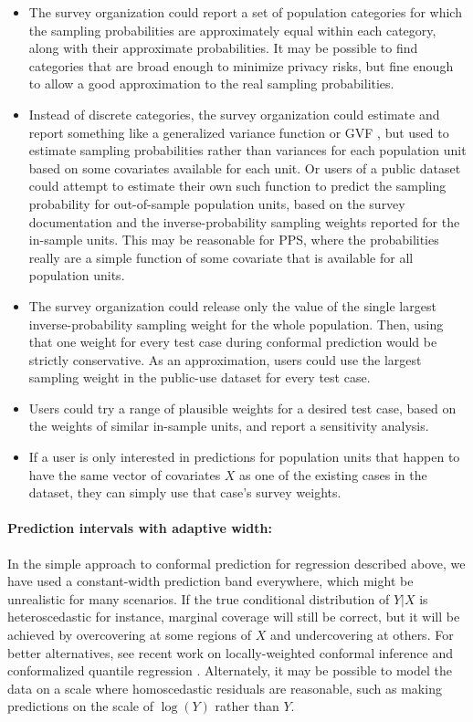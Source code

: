 \documentclass[10.5pt, letterpaper]{article}
\numberwithin{table}{section}
\numberwithin{figure}{section}
\numberwithin{equation}{section}
\begin{document}
\begin{itemize}
  \item The survey organization could report a set of population categories for which the sampling probabilities are approximately equal within each category, along with their approximate probabilities. It may be possible to find categories that are broad enough to minimize privacy risks, but fine enough to allow a good approximation to the real sampling probabilities.
  \item Instead of discrete categories, the survey organization could estimate and report something like a generalized variance function or GVF \citep{wolter2007generalized}, but used to estimate sampling probabilities rather than variances for each population unit based on some covariates available for each unit. Or users of a public dataset could attempt to estimate their own such function to predict the sampling probability for out-of-sample population units, based on the survey documentation and the inverse-probability sampling weights reported for the in-sample units. This may be reasonable for PPS, where the probabilities really are a simple function of some covariate that is available for all population units.
  \item The survey organization could release only the value of the single largest inverse-probability sampling weight for the whole population. Then, using that one weight for every test case during conformal prediction would be strictly conservative. As an approximation, users could use the largest sampling weight in the public-use dataset for every test case.
  \item Users could try a range of plausible weights for a desired test case, based on the weights of similar in-sample units, and report a sensitivity analysis.
  \item If a user is only interested in predictions for population units that happen to have the same vector of covariates $X$ as one of the existing cases in the dataset, they can simply use that case's survey weights.
\end{itemize}



\paragraph{Prediction intervals with adaptive width:} In the simple approach to conformal prediction for regression described above, we have used a constant-width prediction band everywhere, which might be unrealistic for many scenarios. If the true conditional distribution of $Y|X$ is heteroscedastic for instance, marginal coverage will still be correct, but it will be achieved by overcovering at some regions of $X$ and undercovering at others. For better alternatives, see recent work on locally-weighted conformal inference \citep{lei2018distribution} and conformalized quantile regression \citep{romano2019conformalized}. Alternately, it may be possible to model the data on a scale where homoscedastic residuals are reasonable, such as making predictions on the scale of $\log(Y)$ rather than $Y$.
\end{document}

